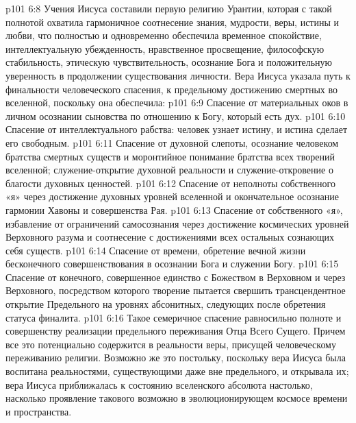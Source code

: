 \vs p101 6:8 Учения Иисуса составили первую религию Урантии, которая с такой полнотой охватила гармоничное соотнесение знания, мудрости, веры, истины и любви, что полностью и одновременно обеспечила временное спокойствие, интеллектуальную убежденность, нравственное просвещение, философскую стабильность, этическую чувствительность, осознание Бога и положительную уверенность в продолжении существования личности. Вера Иисуса указала путь к финальности человеческого спасения, к предельному достижению смертных во вселенной, поскольку она обеспечила:
\vs p101 6:9 \bibnobreakspace Спасение от материальных оков в личном осознании сыновства по отношению к Богу, который есть дух.
\vs p101 6:10 \pc {}\bibnobreakspace Спасение от интеллектуального рабства: человек узнает истину, и истина сделает его свободным.
\vs p101 6:11 \pc {}\bibnobreakspace Спасение от духовной слепоты, осознание человеком братства смертных существ и моронтийное понимание братства всех творений вселенной; служение\hyp{}открытие духовной реальности и служение\hyp{}откровение о благости духовных ценностей.
\vs p101 6:12 \pc {}\bibnobreakspace Спасение от неполноты собственного «я» через достижение духовных уровней вселенной и окончательное осознание гармонии Хавоны и совершенства Рая.
\vs p101 6:13 \pc {}\bibnobreakspace Спасение от собственного «я», избавление от ограничений самосознания через достижение космических уровней Верховного разума и соотнесение с достижениями всех остальных сознающих себя существ.
\vs p101 6:14 \pc {}\bibnobreakspace Спасение от времени, обретение вечной жизни бесконечного совершенствования в осознании Бога и служении Богу.
\vs p101 6:15 \pc {}\bibnobreakspace Спасение от конечного, совершенное единство с Божеством в Верховном и через Верховного, посредством которого творение пытается свершить трансцендентное открытие Предельного на уровнях абсонитных, следующих после обретения статуса финалита.
\vs p101 6:16 \pc Такое семеричное спасение равносильно полноте и совершенству реализации предельного переживания Отца Всего Сущего. Причем все это потенциально содержится в реальности веры, присущей человеческому переживанию религии. Возможно же это постольку, поскольку вера Иисуса была воспитана реальностями, существующими даже вне предельного, и открывала их; вера Иисуса приближалась к состоянию вселенского абсолюта настолько, насколько проявление такового возможно в эволюционирующем космосе времени и пространства.
